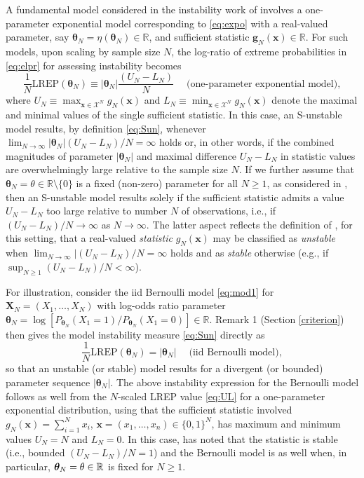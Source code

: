 \documentclass[numbib]{imamat}
\theoremstyle{theorem}
\theoremstyle{lemma}
\theoremstyle{example}
\theoremstyle{corollary}
\theoremstyle{definition}
\theoremstyle{remark}
\theoremstyle{approximation}
\theoremstyle{scheme}
\newcommand{\REP}{\mathrm{LREP}}
\begin{document}
A fundamental model considered in the instability work of
\citet{schweinberger2011instability} involves a one-parameter
exponential model corresponding to \eqref{eq:expo} with a real-valued
parameter, say
\(\boldsymbol \theta_N = \eta(\boldsymbol \theta_N)\in \mathbb{R}\), and
sufficient statistic \(\boldsymbol g_N(\boldsymbol x)\in \mathbb{R}\).
For such models, upon scaling by sample size \(N\), the log-ratio of
extreme probabilities in \eqref{eq:elpr} for assessing instability becomes
\begin{equation}
\label{eq:UL}
\frac{1}{N}\REP(\boldsymbol \theta_N ) \equiv   |\boldsymbol \theta_N| \frac{(U_N-L_N)}{N} \;\quad \text{(one-parameter exponential model)},
\end{equation} where
\(U_N \equiv \max_{\boldsymbol x\in\mathcal{X}^N}g_N(\boldsymbol x)\)
and
\(L_N \equiv \min_{\boldsymbol x\in\mathcal{X}^N}g_N(\boldsymbol x)\)
denote the maximal and minimal values of the single sufficient
statistic. In this case, an S-unstable model results, by definition
\eqref{eq:Sun}, whenever
\(\lim_{N\to \infty} |\boldsymbol \theta_N| (U_N-L_N)/N= \infty\) holds
or, in other words, if the combined magnitudes of parameter
\(|\boldsymbol \theta_N|\) and maximal difference \(U_N-L_N\) in
statistic values are overwhelmingly large relative to the sample size
\(N\). If we further assume that
\(\boldsymbol \theta_N =\theta\in\mathbb{R}\setminus \{0\}\) is a fixed
(non-zero) parameter for all \(N \geq 1\), as considered in
\citet{schweinberger2011instability}, then an S-unstable model results
solely if the sufficient statistic admits a value \(U_N-L_N\) too large
relative to number \(N\) of observations, i.e., if
\((U_N-L_N)/N\to \infty\) as \(N\to \infty\). The latter aspect reflects
the definition of \citet{schweinberger2011instability}, for this
setting, that a real-valued \emph{statistic} \(g_N(\boldsymbol x)\) may
be classified as \emph{unstable} when
\(\lim_{N\to \infty}|(U_N-L_N)/N=\infty\) holds and as \emph{stable}
otherwise (e.g., if \(\sup_{N \geq 1}(U_N-L_N)/N<\infty\)).

For illustration, consider the iid Bernoulli model \eqref{eq:mod1} for
\(\boldsymbol X_N=(X_1,\ldots,X_N)\) with log-odds ratio parameter
\(\boldsymbol \theta_N = \log[ P_{\boldsymbol \theta_N}(X_1=1)/ P_{\boldsymbol \theta_N}(X_1=0)]\in\mathbb{R}\).
Remark 1 (Section \ref{criterion}) then gives the model instability
measure \eqref{eq:Sun} directly as \[
\frac{1}{N}\REP(\boldsymbol \theta_N ) = |\boldsymbol \theta_N|\quad\; \text{(iid Bernoulli model)},
\] so that an unstable (or stable) model results for a divergent (or
bounded) parameter sequence \(|\boldsymbol \theta_N|\). The above
instability expression for the Bernoulli model follows as well from the
\(N\)-scaled LREP value \eqref{eq:UL} for a one-parameter exponential
distribution, using that the sufficient statistic involved
\(g_N(\boldsymbol x)= \sum_{i=1}^N x_i\),
\(\boldsymbol x =(x_1,\ldots,x_n)\in\{0,1\}^N\), has maximum and minimum
values \(U_N=N\) and \(L_N=0\). In this case,
\citet{schweinberger2011instability} has noted that the statistic is
stable (i.e., bounded \((U_N-L_N)/N=1\)) and the Bernoulli model is as
well when, in particular,
\(\boldsymbol \theta_N=\bold \theta \in\mathbb{R}\) is fixed for
\(N \geq 1\).
\end{document}
